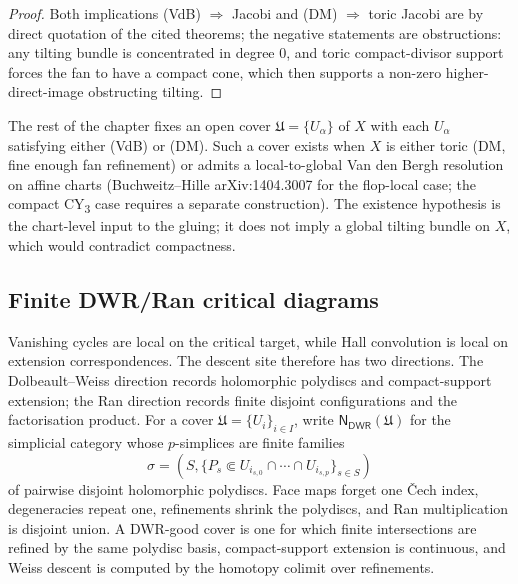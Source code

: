 \begin{proof}
Both implications (VdB) $\Rightarrow$ Jacobi and (DM) $\Rightarrow$
toric Jacobi are by direct quotation of the cited theorems; the
negative statements are obstructions: any tilting bundle is
concentrated in degree 0, and toric compact-divisor support forces
the fan to have a compact cone, which then supports a non-zero
higher-direct-image obstructing tilting.
\end{proof}

\begin{remark}
\label{rem:scope-critical-coha-local}
The rest of the chapter fixes an open cover $\mathfrak{U} =
\{U_\alpha\}$ of $X$ with each $U_\alpha$ satisfying either (VdB)
or (DM). Such a cover exists when $X$ is either toric (DM, fine
enough fan refinement) or admits a local-to-global Van den Bergh
resolution on affine charts (Buchweitz--Hille arXiv:1404.3007 for
the flop-local case; the compact CY\textsubscript{3} case requires a
separate construction).
The existence hypothesis is the chart-level input to the
gluing; it does not imply a global tilting bundle on $X$, which
would contradict compactness.
\end{remark}

\subsection{Finite DWR/Ran critical diagrams}
\label{sec:sheaf-of-cohas}

Vanishing cycles are local on the critical target, while Hall
convolution is local on extension correspondences. The descent site
therefore has two directions. The Dolbeault--Weiss direction records
holomorphic polydiscs and compact-support extension; the Ran direction
records finite disjoint configurations and the factorisation product.
For a cover $\mathfrak U=\{U_i\}_{i\in I}$, write
$\mathsf N_{\mathsf{DW\!R}}(\mathfrak U)$ for the simplicial category
whose $p$-simplices are finite families
\[
 \sigma=(S,\{P_s\Subset U_{i_{s,0}}\cap\cdots\cap U_{i_{s,p}}\}_{s\in S})
\]
of pairwise disjoint holomorphic polydiscs. Face maps forget one
\v{C}ech index, degeneracies repeat one, refinements shrink the
polydiscs, and Ran multiplication is disjoint union. A DWR-good cover
is one for which finite intersections are refined by the same
polydisc basis, compact-support extension is continuous, and Weiss
descent is computed by the homotopy colimit over refinements.

